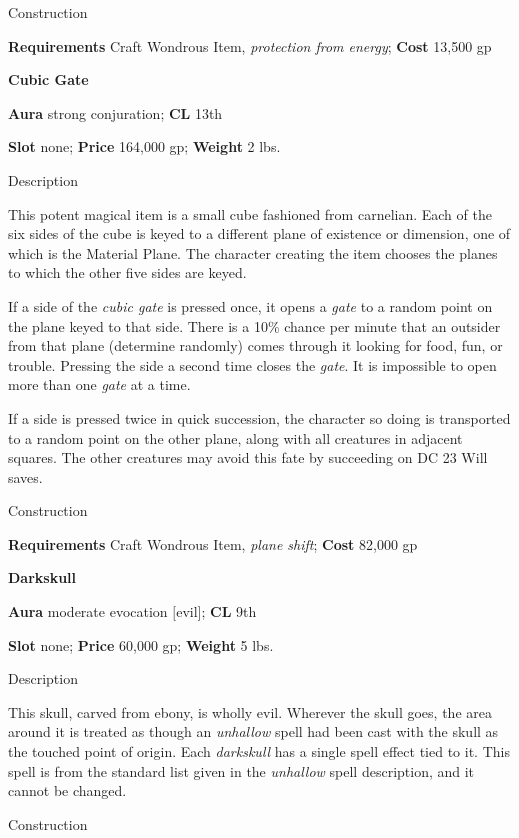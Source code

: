 Construction
				
\textbf{Requirements} Craft Wondrous Item, \textit{protection from energy}; \textbf{Cost }13,500 gp
				
\textbf{Cubic Gate}
				
\textbf{Aura} strong conjuration;\textbf{ CL }13th
				
\textbf{Slot} none; \textbf{Price} 164,000 gp; \textbf{Weight }2 lbs.
				
Description
				
This potent magical item is a small cube fashioned from carnelian. Each of the six sides of the cube is keyed to a different plane of existence or dimension, one of which is the Material Plane. The character creating the item chooses the planes to which the other five sides are keyed.
				
If a side of the \textit{cubic gate }is pressed once, it opens a \textit{gate }to a random point on the plane keyed to that side. There is a 10\% chance per minute that an outsider from that plane (determine randomly) comes through it looking for food, fun, or trouble. Pressing the side a second time closes the \textit{gate}. It is impossible to open more than one \textit{gate }at a time.
				
If a side is pressed twice in quick succession, the character so doing is transported to a random point on the other plane, along with all creatures in adjacent squares. The other creatures may avoid this fate by succeeding on DC 23 Will saves. 
				
Construction
				
\textbf{Requirements} Craft Wondrous Item, \textit{plane shift}; \textbf{Cost }82,000 gp
				
\textbf{Darkskull}
				
\textbf{Aura} moderate evocation \mbox{$[$}evil\mbox{$]$};\textbf{ CL }9th
				
\textbf{Slot} none; \textbf{Price} 60,000 gp; \textbf{Weight} 5 lbs.
				
Description
				
This skull, carved from ebony, is wholly evil. Wherever the skull goes, the area around it is treated as though an \textit{unhallow }spell had been cast with the skull as the touched point of origin. Each \textit{darkskull }has a single spell effect tied to it. This spell is from the standard list given in the \textit{unhallow }spell description, and it cannot be changed. 
				
Construction
				
